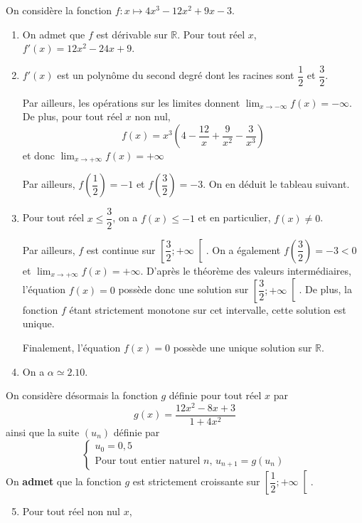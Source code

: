 \documentclass[11pt,fleqn, openany]{book} %
\begin{document}
\begin{solution}On considère la fonction $f : x \mapsto 4x^3-12x^2+9x-3$.

\begin{enumerate}
\item On admet que $f$ est dérivable sur $\mathbb{R}$. Pour tout réel $x$, $f'(x)=12x^2-24x+9$.
\vskip5pt
\item $f'(x)$ est un polynôme du second degré dont les racines sont $\dfrac{1}{2}$ et $ \dfrac{3}{2}$.

Par ailleurs, les opérations sur les limites donnent $\displaystyle\lim_{x \to - \infty}f(x)=-\infty$. De plus, pour tout réel $x$ non nul, 
\[f(x)=x^3\left(4-\dfrac{12}{x}+\dfrac{9}{x^2}-\dfrac{3}{x^3}\right)\]
et donc $\displaystyle\lim_{x \to + \infty}f(x)=+\infty$

 Par ailleurs, $f\left(\dfrac{1}{2}\right)=-1$ et $f\left(\dfrac{3}{2}\right)=-3$.  On en déduit le tableau suivant.

\begin{center}
\end{center}

\vskip5pt
\item Pour tout réel $x \leqslant \dfrac{3}{2}$, on a $f(x) \leqslant -1$ et en particulier, $f(x) \neq 0$.

Par ailleurs, $f$ est continue sur $\left[\dfrac{3}{2} ; + \infty \right[$. On a également $f\left(\dfrac{3}{2}\right)=-3<0$ et $\displaystyle\lim_{x \to + \infty}f(x)=+\infty$. D'après le théorème des valeurs intermédiaires, l'équation $f(x)=0$ possède donc une solution sur $\left[\dfrac{3}{2} ; + \infty \right[$. De plus, la fonction $f$ étant strictement monotone sur cet intervalle, cette solution est unique.

Finalement, l'équation $f(x)=0$ possède une unique solution sur $\mathbb{R}$.

\vskip5pt
\item On a $\alpha \simeq 2.10$.
\end{enumerate}
\vskip10pt
On considère désormais la fonction $g$ définie pour tout réel $x$ par
\[g(x)=\dfrac{12x^2-8x+3}{1+4x^2}\]
ainsi que la suite $(u_n)$ définie par
\[\left\{\begin{array}{l} u_0=0,5 \\ \text{Pour tout entier naturel }n,\,u_{n+1}=g(u_n) \end{array}\right.\]
On \textbf{admet} que la fonction $g$ est strictement croissante sur $\left[ \dfrac{1}{2} ; +\infty \right[$.
\vskip10pt
\begin{enumerate}
\setcounter{enumi}{4}
\item Pour tout réel non nul $x$,


\end{enumerate}
\end{solution}
\end{document}
